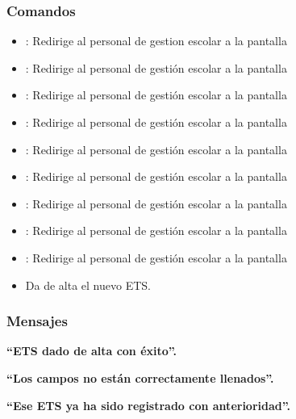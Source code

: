 \subsubsection{Comandos}
\begin{itemize}
	\item {}: Redirige al personal de gestion escolar a la pantalla 
	
	\item {}: Redirige al personal de gestión escolar a la pantalla 
	\item {}: Redirige al personal de gestión escolar a la pantalla 
	
	\item {}: Redirige al personal de gestión escolar a la pantalla 
	\item {}: Redirige al personal de gestión escolar a la pantalla 
	
	\item {}: Redirige al personal de gestión escolar a la pantalla 
	\item {}: Redirige al personal de gestión escolar a la pantalla 
	
	\item {}: Redirige al personal de gestión escolar a la pantalla 
	\item {}: Redirige al personal de gestión escolar a la pantalla 
	
    \item {} Da de alta el nuevo ETS.
\end{itemize}

\subsubsection{Mensajes}

\begin{Citemize}
    \item {\bf ``ETS  dado de alta con éxito''.}
    \item {\bf ``Los campos no están correctamente llenados''.}
    \item {\bf ``Ese ETS ya ha sido registrado con anterioridad''.}
    
\end{Citemize}

